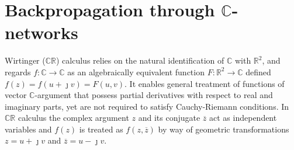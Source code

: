 \documentclass[a4paper,10pt,twocolumn]{article}
\newcommand{\real}{\mathbb{R}}
\newcommand{\cplx}{\mathbb{C}}
\newcommand{\iu}{{\jmath}}
\newcommand{\conj}[1]{\overline{#1}}
\begin{document}

\section{Backpropagation through $\cplx$-networks} %
\label{sub:wirtinger_calculus}

Wirtinger ($\cplx\real$) calculus relies on the natural identification of $\cplx$ with $
  \real^2
$, and regards $
  f\colon \cplx \to \cplx
$ as an algebraically equivalent function $F\colon \real^2 \to \cplx$ defined $
  f(z) = f(u + \iu v) = F(u, v)
$. It enables general treatment of functions of vector $\cplx$-argument that possess partial
derivatives with respect to real and imaginary parts, yet are not required to satisfy
Cauchy-Riemann conditions. In $\cplx\real$ calculus the complex argument $z$ and its
conjugate $\conj{z}$ act as independent variables and $f(z)$ is treated as $f(z, \conj{z})$
by way of geometric transformations $z = u + \iu v$ and $\conj{z} = u - \iu v$.
\end{document}
